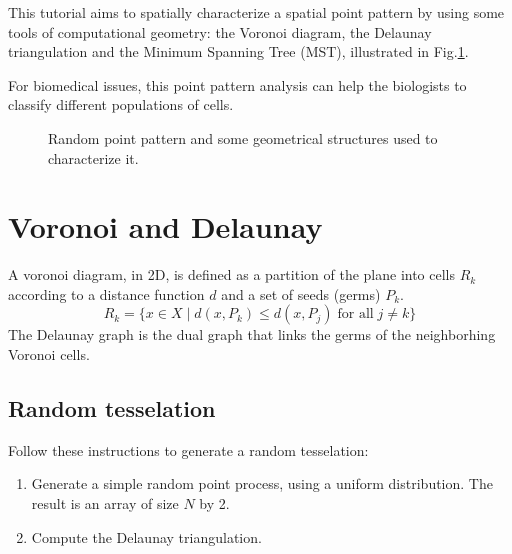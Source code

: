 \def\difficulty{2}

\begin{note}
This tutorial aims to spatially characterize a spatial point pattern by using some 
tools of computational geometry: the Voronoi diagram, 
the Delaunay triangulation and the Minimum Spanning Tree (MST), illustrated in Fig.\ref{fig:point_processes_voronoi:enonce:geometry}.

For biomedical issues, this point pattern analysis can help the biologists 
to classify different populations of cells.
\end{note}

\begin{figure}[htbp]
 \centering\caption{Random point pattern and some geometrical structures used to characterize it.}%
 \hfill
 
 \hfill
 \label{fig:point_processes_voronoi:enonce:geometry}%
\end{figure}


\section{Voronoi and Delaunay}%
A voronoi diagram, in 2D, is defined as a partition of the plane into cells $R_k$ according to a distance function $d$ and a set of seeds 
(germs) $P_k$. 
$$R_k = \{x \in X \mid d(x, P_k) \leq d(x, P_j)\; \text{for all}\; j \neq k\}$$
The Delaunay graph is the dual graph that links the germs of the neighborhing Voronoi cells.

\subsection{Random tesselation}
Follow these instructions to generate a random tesselation:
\begin{qbox}
\begin{enumerate}
	\item Generate a simple random point process, using a uniform distribution. The result is an array of size $N$ by 2.
	\item Compute the Delaunay triangulation.
\end{enumerate}
\end{qbox}

